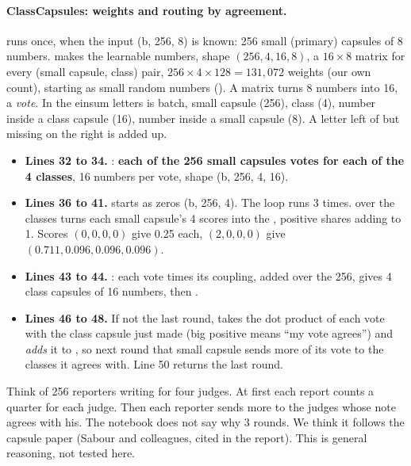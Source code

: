 \paragraph{ClassCapsules: weights and routing by agreement.}
 runs once, when the input (b, 256, 8) is known: 256 small (primary) capsules of 8 numbers.  makes the learnable numbers, shape $(256,4,16,8)$, a $16\times8$ matrix for every (small capsule, class) pair, $256\times4\times128=131{,}072$ weights (our own count), starting as small random numbers (). A matrix turns 8 numbers into 16, a \emph{vote}.
In the einsum letters  is batch,  small capsule (256),  class (4),  number inside a class capsule (16),  number inside a small capsule (8). A letter left of \cd{->} but missing on the right is added up.
\begin{itemize}
\item \textbf{Lines 32 to 34.} : \textbf{each of the 256 small capsules votes for each of the 4 classes}, 16 numbers per vote, shape (b, 256, 4, 16).
\item \textbf{Lines 36 to 41.}  starts as zeros (b, 256, 4). The loop runs 3 times.  over the classes turns each small capsule's 4 scores into the , positive shares adding to 1. Scores $(0,0,0,0)$ give 0.25 each, $(2,0,0,0)$ give $(0.711,0.096,0.096,0.096)$.
\item \textbf{Lines 43 to 44.} : each vote times its coupling, added over the 256, gives 4 class capsules of 16 numbers, then .
\item \textbf{Lines 46 to 48.} If not the last round,  takes the dot product of each vote with the class capsule just made (big positive means ``my vote agrees'') and \emph{adds} it to , so next round that small capsule sends more of its vote to the classes it agrees with. Line 50 returns the last round.
\end{itemize}
Think of 256 reporters writing for four judges. At first each report counts a quarter for each judge. Then each reporter sends more to the judges whose note agrees with his. The notebook does not say why 3 rounds. We think it follows the capsule paper (Sabour and colleagues, cited in the report). This is general reasoning, not tested here.

